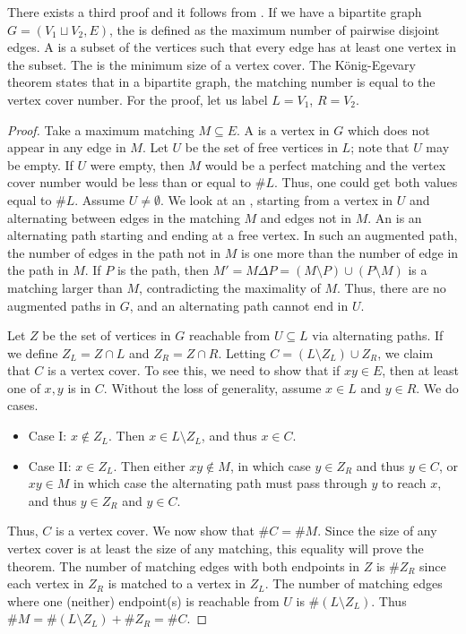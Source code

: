There exists a third proof and it follows from . If we have a bipartite graph $G = (V_{1} \sqcup V_{2},E)$, the  is defined as the maximum number of pairwise disjoint edges. A  is a subset of the vertices such that every edge has at least one vertex in the subset. The  is the minimum size of a vertex cover. The K\"onig-Egevary theorem states that in a bipartite graph, the matching number is equal to the vertex cover number. For the proof, let us label $L = V_{1}$, $R = V_{2}$.
\begin{proof}
    Take a maximum matching $M \subseteq E$. A  is a vertex in $G$ which does not appear in any edge in $M$. Let $U$ be the set of free vertices in $L$; note that $U$ may be empty. If $U$ were empty, then $M$ would be a perfect matching and the vertex cover number would be less than or equal to $\# L$. Thus, one could get both values equal to $\# L$. Assume $U \neq \emptyset$. We look at an , starting from a vertex in $U$ and alternating between edges in the matching $M$ and edges not in $M$. An  is an alternating path starting and ending at a free vertex. In such an augmented path, the number of edges in the path not in $M$ is one more than the number of edge in the path in $M$. If $P$ is the path, then $M' = M \Delta P = (M \setminus P) \cup (P \setminus M)$ is a matching larger than $M$, contradicting the maximality of $M$. Thus, there are no augmented paths in $G$, and an alternating path cannot end in $U$.

    Let $Z$ be the set of vertices in $G$ reachable from $U \subseteq L$ via alternating paths. If we define $Z_{L} = Z \cap L$ and $Z_{R} = Z \cap R$. Letting $C = (L \setminus Z_{L}) \cup Z_{R}$, we claim that $C$ is a vertex cover. To see this, we need to show that if $xy \in E$, then at least one of $x,y$ is in $C$. Without the loss of generality, assume $x \in L$ and $y \in R$. We do cases.
    \begin{itemize}
        \item Case I: $x \notin Z_{L}$. Then $x \in L \setminus Z_{L}$, and thus $x \in C$.
        \item Case II: $x \in Z_{L}$. Then either $xy \notin M$, in which case $y \in Z_{R}$ and thus $y \in C$, or $xy \in M$ in which case the alternating path must pass through $y$ to reach $x$, and thus $y \in Z_{R}$ and $y \in C$.
    \end{itemize}
    Thus, $C$ is a vertex cover. We now show that $\# C = \# M$. Since the size of any vertex cover is at least the size of any matching, this equality will prove the theorem. The number of matching edges with both endpoints in $Z$ is $\# Z_{R}$ since each vertex in $Z_{R}$ is matched to a vertex in $Z_{L}$. The number of matching edges where one (neither) endpoint(s) is reachable from $U$ is $\#(L\setminus Z_{L})$. Thus $\# M = \#(L \setminus Z_{L}) + \# Z_{R} = \# C$.
\end{proof}

